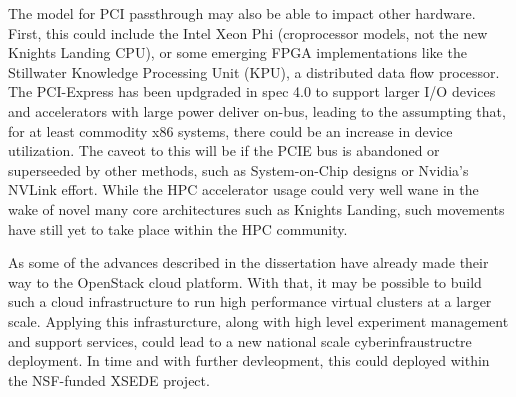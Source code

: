 The model for PCI passthrough may also be able to impact other hardware. First, this could include the Intel Xeon Phi (croprocessor models, not the new Knights Landing CPU), or some emerging FPGA implementations like the Stillwater Knowledge Processing Unit (KPU), a distributed data flow processor.  The PCI-Express has been updgraded in spec 4.0 to support larger I/O devices and accelerators with large power deliver on-bus, leading to the assumpting that, for at least commodity x86 systems, there could be an increase in device utilization. The caveot to this will be if the PCIE bus is abandoned or superseeded by other methods, such as System-on-Chip designs or Nvidia's NVLink effort.  While the HPC accelerator usage could very well wane in the wake of novel many core architectures such as Knights Landing, such movements have still yet to take place within the HPC community.  

As some of the advances described in the dissertation have already made their way to the OpenStack cloud platform. With that, it may be possible to build such a cloud infrastructure to run high performance virtual clusters at a larger scale. Applying this infrasturcture, along with high level experiment management and support services, could lead to a new national scale cyberinfraustructre deployment.  In time and with further devleopment, this could deployed within the NSF-funded XSEDE project.  

